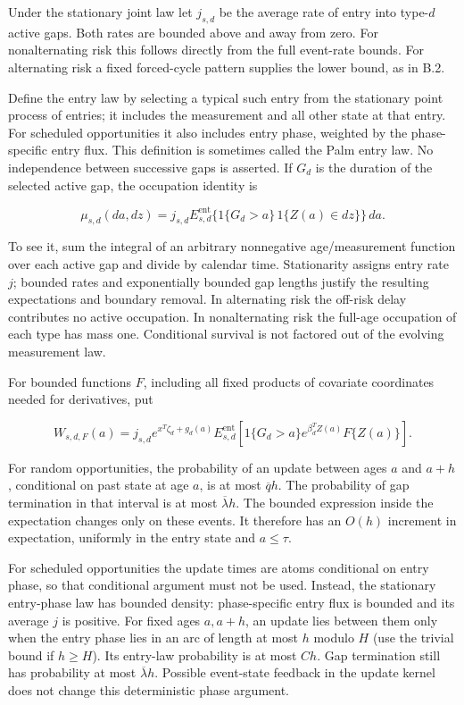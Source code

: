 \documentclass[11pt]{article}
\begin{document}
Under the stationary joint law let \(j_{s,d}\) be the average rate of entry into type-\(d\) active gaps. Both rates are bounded above and away from zero. For nonalternating risk this follows directly from the full event-rate bounds. For alternating risk a fixed forced-cycle pattern supplies the lower bound, as in B.2.

Define the entry law by selecting a typical such entry from the stationary point process of entries; it includes the measurement and all other state at that entry. For scheduled opportunities it also includes entry phase, weighted by the phase-specific entry flux. This definition is sometimes called the Palm entry law. No independence between successive gaps is asserted. If \(G_d\) is the duration of the selected active gap, the occupation identity is

\begin{equation*}
\mu_{s,d}(da,dz)=j_{s,d}
 E^{\mathrm{ent}}_{s,d}\{1\{G_d>a\}\,1\{Z(a)\in dz\}\}\,da.
\tag{I.2}\label{eq:I.2}
\end{equation*}

To see it, sum the integral of an arbitrary nonnegative age/measurement function over each active gap and divide by calendar time. Stationarity assigns entry rate \(j\); bounded rates and exponentially bounded gap lengths justify the resulting expectations and boundary removal. In alternating risk the off-risk delay contributes no active occupation. In nonalternating risk the full-age occupation of each type has mass one. Conditional survival is not factored out of the evolving measurement law.

For bounded functions \(F\), including all fixed products of covariate coordinates needed for derivatives, put

\begin{equation*}
W_{s,d,F}(a)=j_{s,d} e^{x^T\zeta_d+g_d(a)}
 E^{\mathrm{ent}}_{s,d}\!\left[1\{G_d>a\}e^{\beta_d^TZ(a)}F\{Z(a)\}\right].
\tag{I.3}\label{eq:I.3}
\end{equation*}

For random opportunities, the probability of an update between ages \(a\) and \(a+h\), conditional on past state at age \(a\), is at most \(\overline q h\). The probability of gap termination in that interval is at most \(\overline\lambda h\). The bounded expression inside the expectation changes only on these events. It therefore has an \(O(h)\) increment in expectation, uniformly in the entry state and \(a\leq\tau\).

For scheduled opportunities the update times are atoms conditional on entry phase, so that conditional argument must not be used. Instead, the stationary entry-phase law has bounded density: phase-specific entry flux is bounded and its average \(j\) is positive. For fixed ages \(a,a+h\), an update lies between them only when the entry phase lies in an arc of length at most \(h\) modulo \(H\) (use the trivial bound if \(h\geq H\)). Its entry-law probability is at most \(Ch\). Gap termination still has probability at most \(\overline\lambda h\). Possible event-state feedback in the update kernel does not change this deterministic phase argument.
\end{document}
